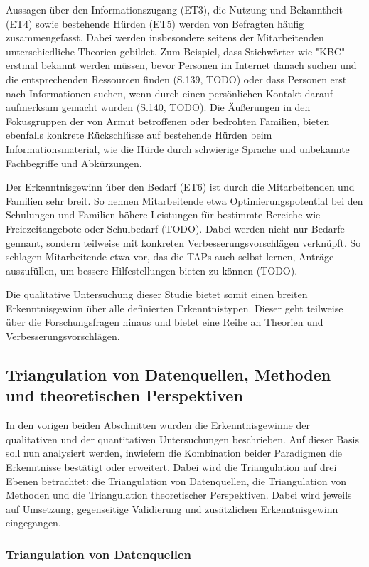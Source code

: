Aussagen über den Informationszugang (ET3), die Nutzung und Bekanntheit (ET4) sowie bestehende Hürden (ET5) werden von Befragten häufig zusammengefasst. Dabei werden insbesondere seitens der Mitarbeitenden unterschiedliche Theorien gebildet. Zum Beispiel, dass Stichwörter wie "KBC" erstmal bekannt werden müssen, bevor Personen im Internet danach suchen und die entsprechenden Ressourcen finden (S.139, TODO) oder dass Personen erst nach Informationen suchen, wenn durch einen persönlichen Kontakt darauf aufmerksam gemacht wurden (S.140, TODO). Die Äußerungen in den Fokusgruppen der von Armut betroffenen oder bedrohten Familien, bieten ebenfalls konkrete Rückschlüsse auf bestehende Hürden beim Informationsmaterial, wie die Hürde durch schwierige Sprache und unbekannte Fachbegriffe und Abkürzungen.

Der Erkenntnisgewinn über den Bedarf (ET6) ist durch die Mitarbeitenden und Familien sehr breit. So nennen Mitarbeitende etwa Optimierungspotential bei den Schulungen und Familien höhere Leistungen für bestimmte Bereiche wie Freiezeitangebote oder Schulbedarf (TODO). Dabei werden nicht nur Bedarfe gennant, sondern teilweise mit konkreten Verbesserungsvorschlägen verknüpft. So schlagen Mitarbeitende etwa vor, das die TAPs auch selbst lernen, Anträge auszufüllen, um bessere Hilfestellungen bieten zu können (TODO).

Die qualitative Untersuchung dieser Studie bietet somit einen breiten Erkenntnisgewinn über alle definierten Erkenntnistypen. Dieser geht teilweise über die Forschungsfragen hinaus und bietet eine Reihe an Theorien und Verbesserungsvorschlägen.

\subsection{Triangulation von Datenquellen, Methoden und theoretischen Perspektiven}

In den vorigen beiden Abschnitten wurden die Erkenntnisgewinne der qualitativen und der quantitativen Untersuchungen beschrieben. Auf dieser Basis soll nun analysiert werden, inwiefern die Kombination beider Paradigmen die Erkenntnisse bestätigt oder erweitert. Dabei wird die Triangulation auf drei Ebenen betrachtet: die Triangulation von Datenquellen, die Triangulation von Methoden und die Triangulation theoretischer Perspektiven. Dabei wird jeweils auf Umsetzung, gegenseitige Validierung und zusätzlichen Erkenntnisgewinn eingegangen.

\subsubsection{Triangulation von Datenquellen}

